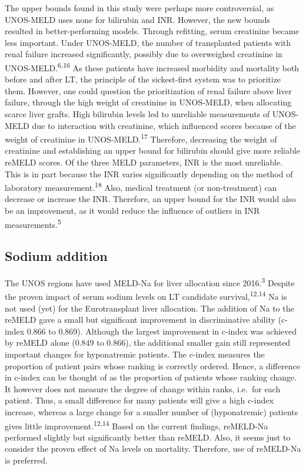 \documentclass[11pt,english,]{book} %
\begin{document}
The upper bounds found in this study were perhaps more controversial, as UNOS-MELD uses none for bilirubin and INR. However, the new bounds resulted in better-performing models. Through refitting, serum creatinine became less important. Under UNOS-MELD, the number of transplanted patients with renal failure increased significantly, possibly due to overweighed creatinine in UNOS-MELD.\textsuperscript{6,16} As these patients have increased morbidity and mortality both before and after LT, the principle of the sickest-first system was to prioritize them. However, one could question the prioritization of renal failure above liver failure, through the high weight of creatinine in UNOS-MELD, when allocating scarce liver grafts.
High bilirubin levels led to unreliable measurements of UNOS-MELD due to interaction with creatinine, which influenced scores because of the weight of creatinine in UNOS-MELD.\textsuperscript{17} Therefore, decreasing the weight of creatinine and establishing an upper bound for bilirubin should give more reliable reMELD scores. Of the three MELD parameters, INR is the most unreliable. This is in part because the INR varies significantly depending on the method of laboratory measurement.\textsuperscript{18} Also, medical treatment (or non-treatment) can decrease or increase the INR. Therefore, an upper bound for the INR would also be an improvement, as it would reduce the influence of outliers in INR measurements.\textsuperscript{5}

\hypertarget{sodium-addition}{%
\subsection*{Sodium addition}\label{sodium-addition}}

The UNOS regions have used MELD-Na for liver allocation since 2016.\textsuperscript{3} Despite the proven impact of serum sodium levels on LT candidate survival,\textsuperscript{12,14} Na is not used (yet) for the Eurotransplant liver allocation. The addition of Na to the reMELD gave a small but significant improvement in discriminative ability (c-index 0.866 to 0.869). Although the largest improvement in c-index was achieved by reMELD alone (0.849 to 0.866), the additional smaller gain still represented important changes for hyponatremic patients. The c-index measures the proportion of patient pairs whose ranking is correctly ordered. Hence, a difference in c-index can be thought of as the proportion of patients whose ranking change. It however does not measure the degree of change within ranks, i.e.~for each patient. Thus, a small difference for many patients will give a high c-index increase, whereas a large change for a smaller number of (hyponatremic) patients gives little improvement.\textsuperscript{12,14} Based on the current findings, reMELD-Na performed slightly but significantly better than reMELD. Also, it seems just to consider the proven effect of Na levels on mortality. Therefore, use of reMELD-Na is preferred.
\end{document}

